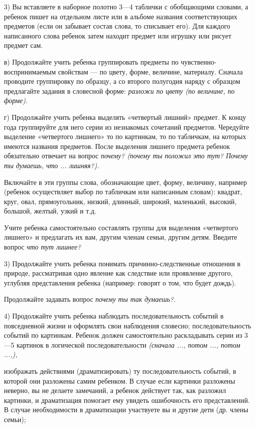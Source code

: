 \documentclass[a5paper]{book}
\renewcommand{\emph}[1]{\textit{#1}}
\begin{document}
3) Вы вставляете в наборное полотно 3---4 таблички с обобщающими
словами, а ребенок пишет на отдельном листе или в альбоме названия
соответствующих предметов (если он забывает состав слова, то списывает
его). Для каждого написанного слова ребенок затем находит предмет или
игрушку или рисует предмет сам.

в) Продолжайте учить ребенка группировать предметы по
чувственно-воспринимаемым свойствам --- по цвету, форме, величине,
материалу. Сначала проводите группировку по образцу, а со второго
полугодия наряду с образцом предлагайте задания в словесной форме:
\emph{разложи по цвету (по величине, по форме).}

г) Продолжайте учить ребенка выделять «четвертый лишний» предмет. К
концу года группируйте для него серии из незнакомых сочетаний предметов.
Чередуйте выделение «четвертого лишнего» то по картинкам, то по
табличкам, на которых имеются названия предметов. После выделения
лишнего предмета ребенок обязательно отвечает на вопрос \emph{почему?
(почему ты положил это тут? Почему ты думаешь, что ... лишняя?).}

Включайте в эти группы слова, обозначающие цвет, форму, величину,
например (ребенок осуществляет выбор по табличкам или написанным
словам): квадрат, круг, овал, прямоугольник, низкий, длинный, широкий,
маленький, высокий, большой, желтый, узкий и т.д.

Учите ребенка самостоятельно составлять группы для выделения «четвертого
лишнего» и предлагать их вам, другим членам семьи, другим детям. Введите
вопрос \emph{что тут лишнее?}

3) Продолжайте учить ребенка понимать причинно-следственные отношения в
природе, рассматривая одно явление как следствие или проявление другого,
углубляя представления ребенка (например: говорят о том, что будет
дождь).

Продолжайте задавать вопрос \emph{почему ты так думаешь?.}

4) Продолжайте учить ребенка наблюдать последовательность событий в
повседневной жизни и оформлять свои наблюдения словесно;
последовательность событий по картинкам. Ребенок должен самостоятельно
раскладывать серии из 3---5 картинок в логической последовательности
\emph{(сначала ..., потом ..., потом ...,),}

изображать действиями (драматизировать) ту последовательность событий, в
которой они разложены самим ребенком. В случае если картинки разложены
неверно, вы не делаете замечаний, а ребенок действует так, как разложил
картинки, и драматизация помогает ему увидеть ошибочность его
представлений. В случае необходимости в драматизации участвуете вы и
другие дети (др. члены семьи);
\end{document}
